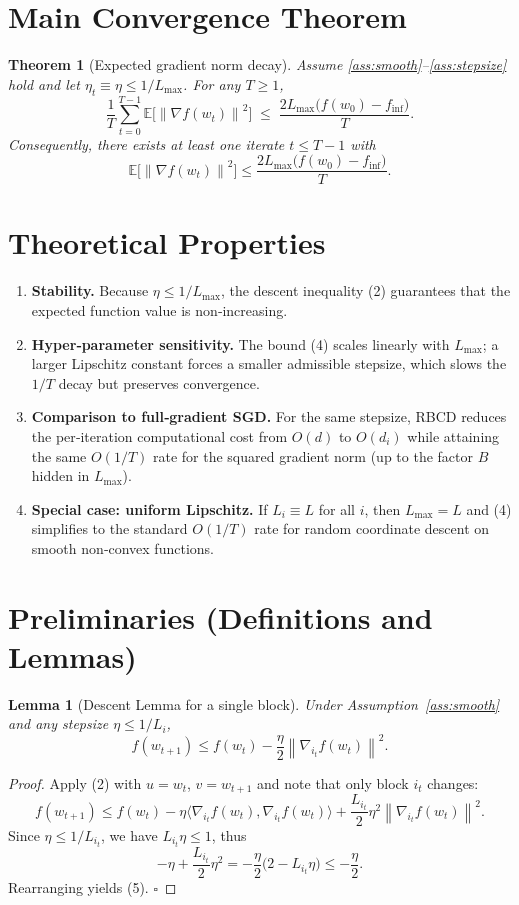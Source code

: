 \documentclass{article}
\newtheorem{theorem}{Theorem}
\newtheorem{lemma}{Lemma}
\newcommand{\E}{\mathbb{E}}
\newcommand{\norm}[1]{\left\|#1\right\|}
\newcommand{\grad}{\nabla}
\begin{document}
\section*{Main Convergence Theorem}
\begin{theorem}[Expected gradient norm decay]\label{thm:main}
Assume \ref{ass:smooth}--\ref{ass:stepsize} hold and let
$\eta_t\equiv\eta\le 1/L_{\max}$.  For any $T\ge1$,
\[
\frac1T\sum_{t=0}^{T-1}\E\!\bigl[\norm{\grad f(w_t)}^{2}\bigr]
\;\le\;
\frac{2L_{\max}\bigl(f(w_0)-f_{\inf}\bigr)}{T}.
\tag{4}
\]
Consequently, there exists at least one iterate $t\le T-1$ with
\[
\E\!\bigl[\norm{\grad f(w_t)}^{2}\bigr]\le
\frac{2L_{\max}\bigl(f(w_0)-f_{\inf}\bigr)}{T}.
\]
\end{theorem}

\section*{Theoretical Properties}
\begin{enumerate}[label=\arabic*)]
\item \textbf{Stability.} Because $\eta\le 1/L_{\max}$, the descent
inequality (2) guarantees that the expected function value is non‑increasing.
\item \textbf{Hyper‑parameter sensitivity.} The bound (4) scales linearly
with $L_{\max}$; a larger Lipschitz constant forces a smaller admissible stepsize,
which slows the $1/T$ decay but preserves convergence.
\item \textbf{Comparison to full‑gradient SGD.} For the same stepsize,
RBCD reduces the per‑iteration computational cost from $O(d)$ to $O(d_i)$
while attaining the same $O(1/T)$ rate for the squared gradient norm (up to the factor $B$ hidden in $L_{\max}$).
\item \textbf{Special case: uniform Lipschitz.} If $L_i\equiv L$ for all $i$,
then $L_{\max}=L$ and (4) simplifies to the standard $O(1/T)$ rate for
random coordinate descent on smooth non‑convex functions.
\end{enumerate}

\section*{Preliminaries (Definitions and Lemmas)}
\begin{lemma}[Descent Lemma for a single block]\label{lem:descent}
Under Assumption~\ref{ass:smooth} and any stepsize $\eta\le 1/L_i$,
\[
f(w_{t+1})\le f(w_t)-\frac{\eta}{2}\norm{\grad_{i_t}f(w_t)}^{2}.
\tag{5}
\]
\end{lemma}
\begin{proof}
Apply (2) with $u=w_t$, $v=w_{t+1}$ and note that only block $i_t$ changes:
\[
f(w_{t+1})\le f(w_t)-\eta\langle \grad_{i_t}f(w_t),\grad_{i_t}f(w_t)\rangle
+\frac{L_{i_t}}{2}\eta^{2}\norm{\grad_{i_t}f(w_t)}^{2}.
\]
Since $\eta\le 1/L_{i_t}$, we have $L_{i_t}\eta\le1$, thus
\[
-\eta+\frac{L_{i_t}}{2}\eta^{2}
=-\frac{\eta}{2}\bigl(2-L_{i_t}\eta\bigr)\le -\frac{\eta}{2}.
\]
Rearranging yields (5). \hfill $\square$
\end{proof}
\end{document}
